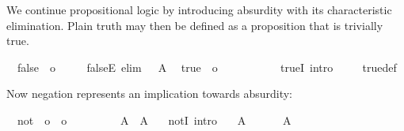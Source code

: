 \begin{isabellebody}
\begin{isamarkuptext}
  \medskip We continue propositional logic by introducing absurdity
  with its characteristic elimination.  Plain truth may then be
  defined as a proposition that is trivially true.%
\end{isamarkuptext}%
\isamarkuptrue%
\isamarkupfalse%
\isanewline
\ \ false\ {\isacharcolon}{\isacharcolon}\ o\ \ {\isacharparenleft}{\isachardoublequoteopen}{\isasymbottom}{\isachardoublequoteclose}{\isacharparenright}\ \isanewline
\ \ falseE\ {\isacharbrackleft}elim{\isacharbrackright}{\isacharcolon}\ {\isachardoublequoteopen}{\isasymbottom}\ {\isasymLongrightarrow}\ A{\isachardoublequoteclose}\isanewline
\isanewline
{}\isamarkupfalse%
\isanewline
\ \ true\ {\isacharcolon}{\isacharcolon}\ o\ \ {\isacharparenleft}{\isachardoublequoteopen}{\isasymtop}{\isachardoublequoteclose}{\isacharparenright}\ \isanewline
\ \ {\isachardoublequoteopen}{\isasymtop}\ {\isasymequiv}\ {\isasymbottom}\ {\isasymlongrightarrow}\ {\isasymbottom}{\isachardoublequoteclose}\isanewline
\isanewline
{}\isamarkupfalse%
\ trueI\ {\isacharbrackleft}intro{\isacharbrackright}{\isacharcolon}\ {\isasymtop}\isanewline
%
\isadelimproof
\ \ %
\endisadelimproof
%
\isatagproof
{}\isamarkupfalse%
\ true{\isacharunderscore}def\ \isacommand{{\isachardot}{\isachardot}}\isamarkupfalse%
%
\endisatagproof
{\isafoldproof}%
%
\isadelimproof
%
\endisadelimproof
%
\begin{isamarkuptext}%
\medskip\noindent Now negation represents an implication towards
  absurdity:%
\end{isamarkuptext}%
\isamarkuptrue%
\isamarkupfalse%
\isanewline
\ \ not\ {\isacharcolon}{\isacharcolon}\ {\isachardoublequoteopen}o\ {\isasymRightarrow}\ o{\isachardoublequoteclose}\ \ {\isacharparenleft}{\isachardoublequoteopen}{\isasymnot}\ {\isacharunderscore}{\isachardoublequoteclose}\ {\isacharbrackleft}{}{}{\isacharbrackright}\ {}{}{\isacharparenright}\ \isanewline
\ \ {\isachardoublequoteopen}{\isasymnot}\ A\ {\isasymequiv}\ A\ {\isasymlongrightarrow}\ {\isasymbottom}{\isachardoublequoteclose}\isanewline
\isanewline
{}\isamarkupfalse%
\ notI\ {\isacharbrackleft}intro{\isacharbrackright}{\isacharcolon}\isanewline
\ \ \ {\isachardoublequoteopen}A\ {\isasymLongrightarrow}\ {\isasymbottom}{\isachardoublequoteclose}\isanewline
\ \ \ {\isachardoublequoteopen}{\isasymnot}\ A{\isachardoublequoteclose}\isanewline

\end{isabellebody}
